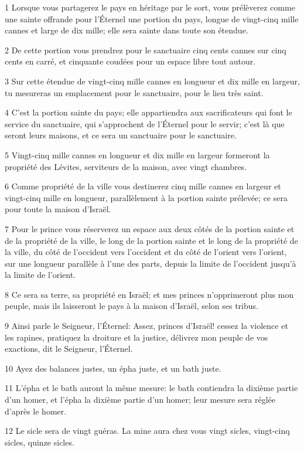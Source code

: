\par 1 Lorsque vous partagerez le pays en héritage par le sort, vous prélèverez comme une sainte offrande pour l'Éternel une portion du pays, longue de vingt-cinq mille cannes et large de dix mille; elle sera sainte dans toute son étendue.
\par 2 De cette portion vous prendrez pour le sanctuaire cinq cents cannes sur cinq cents en carré, et cinquante coudées pour un espace libre tout autour.
\par 3 Sur cette étendue de vingt-cinq mille cannes en longueur et dix mille en largeur, tu mesureras un emplacement pour le sanctuaire, pour le lieu très saint.
\par 4 C'est la portion sainte du pays; elle appartiendra aux sacrificateurs qui font le service du sanctuaire, qui s'approchent de l'Éternel pour le servir; c'est là que seront leurs maisons, et ce sera un sanctuaire pour le sanctuaire.
\par 5 Vingt-cinq mille cannes en longueur et dix mille en largeur formeront la propriété des Lévites, serviteurs de la maison, avec vingt chambres.
\par 6 Comme propriété de la ville vous destinerez cinq mille cannes en largeur et vingt-cinq mille en longueur, parallèlement à la portion sainte prélevée; ce sera pour toute la maison d'Israël.
\par 7 Pour le prince vous réserverez un espace aux deux côtés de la portion sainte et de la propriété de la ville, le long de la portion sainte et le long de la propriété de la ville, du côté de l'occident vers l'occident et du côté de l'orient vers l'orient, sur une longueur parallèle à l'une des parts, depuis la limite de l'occident jusqu'à la limite de l'orient.
\par 8 Ce sera sa terre, sa propriété en Israël; et mes princes n'opprimeront plus mon peuple, mais ils laisseront le pays à la maison d'Israël, selon ses tribus.
\par 9 Ainsi parle le Seigneur, l'Éternel: Assez, princes d'Israël! cessez la violence et les rapines, pratiquez la droiture et la justice, délivrez mon peuple de vos exactions, dit le Seigneur, l'Éternel.
\par 10 Ayez des balances justes, un épha juste, et un bath juste.
\par 11 L'épha et le bath auront la même mesure: le bath contiendra la dixième partie d'un homer, et l'épha la dixième partie d'un homer; leur mesure sera réglée d'après le homer.
\par 12 Le sicle sera de vingt guéras. La mine aura chez vous vingt sicles, vingt-cinq sicles, quinze sicles.
